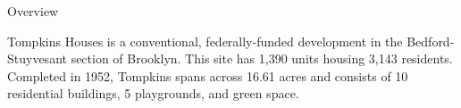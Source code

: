 Overview

Tompkins Houses is a conventional, federally-funded development in the Bedford-Stuyvesant section of Brooklyn. This site has 1,390 units housing 3,143 residents. Completed in 1952, Tompkins spans across 16.61 acres and consists of 10 residential buildings, 5 playgrounds, and green space. 